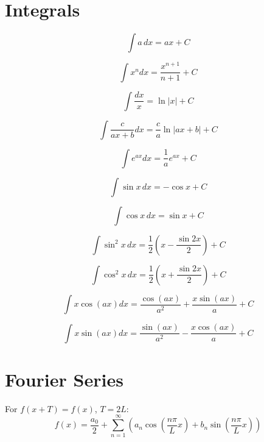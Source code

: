 \documentclass[a4paper,12pt]{article}
\begin{document}
\section*{Integrals}
\begin{equation*}
    \int a\,dx = ax + C
\end{equation*}

\begin{equation*}
    \int x^n dx = \frac{x^{n+1}}{n+1} + C
\end{equation*}

\begin{equation*}
    \int \frac{dx}{x} = \ln |x| + C
\end{equation*}

\begin{equation*}
    \int \frac{c}{ax + b} dx = \frac{c}{a} \ln |ax + b| + C
\end{equation*}

\begin{equation*}
    \int e^{ax} dx = \frac{1}{a} e^{ax} + C
\end{equation*}

\begin{equation*}
    \int \sin x\,dx = -\cos x + C
\end{equation*}

\begin{equation*}
    \int \cos x\,dx = \sin x + C
\end{equation*}

\begin{equation*}
    \int \sin^2 x\,dx = \frac{1}{2} \left( x - \frac{\sin 2x}{2} \right) + C
\end{equation*}

\begin{equation*}
    \int \cos^2 x\,dx = \frac{1}{2} \left( x + \frac{\sin 2x}{2} \right) + C
\end{equation*}

\begin{equation*}
    \int x \cos(ax) dx = \frac{\cos(ax)}{a^2} + \frac{x \sin(ax)}{a} + C
\end{equation*}

\begin{equation*}
    \int x \sin(ax) dx = \frac{\sin(ax)}{a^2} - \frac{x \cos(ax)}{a} + C
\end{equation*}

\section*{Fourier Series}
For $f(x + T) = f(x)$, $T = 2L$:
\begin{equation*}
    f(x) = \frac{a_0}{2} + \sum_{n=1}^{\infty} \left( a_n \cos\left(\frac{n \pi}{L} x\right) + b_n \sin\left(\frac{n \pi}{L} x\right) \right)
\end{equation*}
\end{document}
